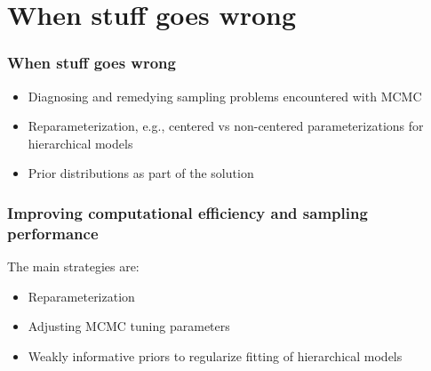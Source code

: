 \documentclass[handout]{beamer}
\begin{document}

  


\section{When stuff goes wrong}

\begin{frame}
  \frametitle{When stuff goes wrong}
  
  \begin{itemize}
  \item Diagnosing and remedying sampling problems encountered with MCMC
\item Reparameterization, e.g., centered vs non-centered parameterizations for hierarchical models
\item Prior distributions as part of the solution
  \end{itemize}

\end{frame}

\begin{frame}
  \frametitle{Improving computational efficiency and sampling
    performance}
  
The main strategies are:
\begin{itemize}
\item Reparameterization
\item Adjusting MCMC tuning parameters
\item Weakly informative priors to regularize fitting of hierarchical models
\end{itemize}

\end{frame}
\end{document}

